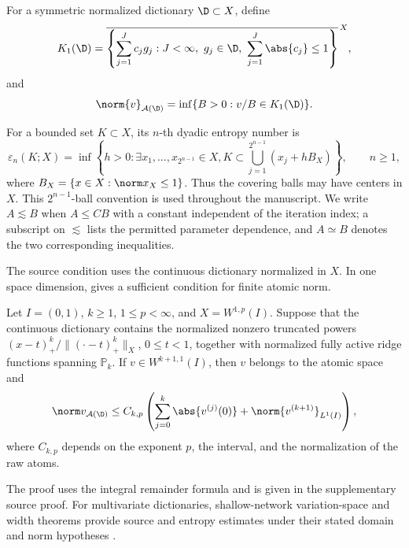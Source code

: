 \begin{definition}
\label{def:atomic}
For a symmetric normalized dictionary \(\D\subset X\), define
\[
 K_1(\D)=\overline{\left\{\sum_{j=1}^Jc_jg_j:
 J<\infty,\ g_j\in\D,\ \sum_{j=1}^J\abs{c_j}\leq1\right\}}^{\,X},
\]
and
\[
 \norm{v}_{\mathcal A(\D)}=
 \inf\{B>0:v/B\in K_1(\D)\}.
\]
\end{definition}

For a bounded set \(K\subset X\), its \(n\)-th dyadic entropy number is
\[
 \varepsilon_n(K;X)=\inf\left\{h>0:\exists x_1,\ldots,x_{2^{n-1}}\in X,
 K\subset\bigcup_{j=1}^{2^{n-1}}(x_j+hB_X)\right\},\qquad n\geq1,
\]
where $B_X=\{x\in X:\norm x_X\leq1\}$. Thus the covering balls may have centers in $X$.
This $2^{n-1}$-ball convention is used throughout the manuscript. We write
$A\lesssim B$ when $A\leq CB$ with a constant independent of the iteration index; a
subscript on $\lesssim$ lists the permitted parameter dependence, and $A\simeq B$ denotes the two
corresponding inequalities.


The source condition uses the continuous dictionary normalized in \(X\). In one space dimension,  gives a sufficient condition for finite atomic norm.

\begin{proposition}
\label{prop:1dsource}
Let \(I=(0,1)\), \(k\geq1\), \(1\leq p<\infty\), and \(X=W^{1,p}(I)\). Suppose that the continuous
dictionary contains the normalized nonzero truncated powers \((x-t)_+^k/\|(\cdot-t)_+^k\|_X\),
\(0\leq t<1\), together with normalized fully active ridge functions spanning \(\mathbb P_k\). If
\(v\in W^{k+1,1}(I)\), then \(v\) belongs to the atomic space and
\[
\norm v_{\mathcal A(\D)}\leq C_{k,p}\left(
 \sum_{j=0}^k\abs{v^{(j)}(0)}+\norm{v^{(k+1)}}_{L^1(I)}\right),
\]
where \(C_{k,p}\) depends on the exponent \(p\), the interval, and the normalization of the raw atoms.
\end{proposition}

The proof uses the integral remainder formula and is given in the supplementary source proof. For multivariate dictionaries, shallow-network variation-space and width theorems provide source and entropy estimates under their stated domain and norm hypotheses \citep{SiegelXuVariation2023,SiegelXuSharp2024,MaoSiegelXu2026}.

